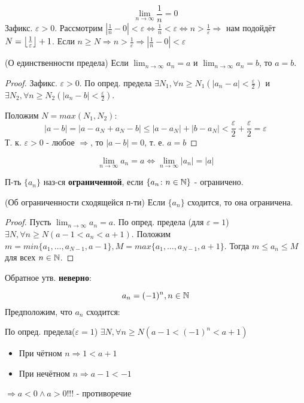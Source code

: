\begin{example}
    \[
    \lim_{n\to\infty}\frac{1}{n} = 0
    \]  
    Зафикс. $\varepsilon > 0$. Рассмотрим $|\frac{1}{n} - 0| < \varepsilon \iff \frac{1}{n} < \varepsilon \iff n > \frac{1}{\varepsilon} \Rightarrow $ нам подойдёт $N = \left\lfloor \frac{1}{\varepsilon} \right\rfloor + 1$. Если $n \geq N \Rightarrow n > \frac{1}{\varepsilon} \Rightarrow |\frac{1}{n} - 0| < \varepsilon$
\end{example}
\begin{theorem}(О единственности предела)
    Если $\lim_{n\to\infty} a_n = a$ и $\lim_{n\to\infty}a_n = b$, то $a = b$.
\end{theorem}
\begin{proof}
Зафикс. $\varepsilon > 0$. По опред. предела $\exists N_1, \forall n \geq N_1 (|a_n - a| < \frac{\varepsilon}{2})$ и $\exists N_2, \forall n \geq N_2(|a_n - b| < \frac{\varepsilon}{2})$.

Положим $N = max(N_1, N_2)$:
\[
|a - b| = |a - a_N + a_N - b| \leq |a - a_N| + |b - a_N| < \frac{\varepsilon}{2} + \frac{\varepsilon}{2} = \varepsilon
\] 
Т. к. $\varepsilon > 0$ - любое $\Rightarrow$, то $|a - b| = 0$, т. е. $a = b$
\end{proof}
\begin{task}
\[
\lim_{n\to\infty}a_n = a \iff \lim_{n\to\infty}|a_n| = |a|
\] 
\end{task}
\begin{definition}
П-ть $\{a_n\}$ наз-ся \textbf{ограниченной}, если $\{a_n \colon  n \in \mathbb{N}\}$ - ограничено.
\end{definition}
\begin{theorem}(Об ограниченности сходящейся п-ти)
Если $\{a_n\}$ сходится, то она ограничена.
\end{theorem}
\begin{proof}
Пусть $\lim_{n\to\infty}a_n = a$. По опред. предела (для $\varepsilon = 1$) $\exists N, \forall n \geq N (a - 1 < a_n < a + 1)$. Положим $m = min\{a_1, \ldots, a_{N - 1}, a - 1\}, M = max \{a_1, \ldots , a_{N - 1}, a + 1\}$. Тогда $m \leq a_n \leq M$ для всех $n \in \mathbb{N}$.
\end{proof}
\begin{note}
Обратное утв. \textbf{неверно}:
\begin{example}
\[
a_n = (-1)^{n}, n \in \mathbb{N}
\] 
Предположим, что $a_n$ сходится:

По опред. предела($\varepsilon = 1$) $\exists N, \forall n \geq N (a - 1 < (-1)^{n} < a + 1) $

\begin{itemize}
    \item При чётном $n \Rightarrow 1 < a + 1$
    \item При нечётном $n \Rightarrow a - 1 < -1$
\end{itemize}
$\Rightarrow a < 0 \land a > 0!!!$ - противоречие
\end{example}
\end{note}


